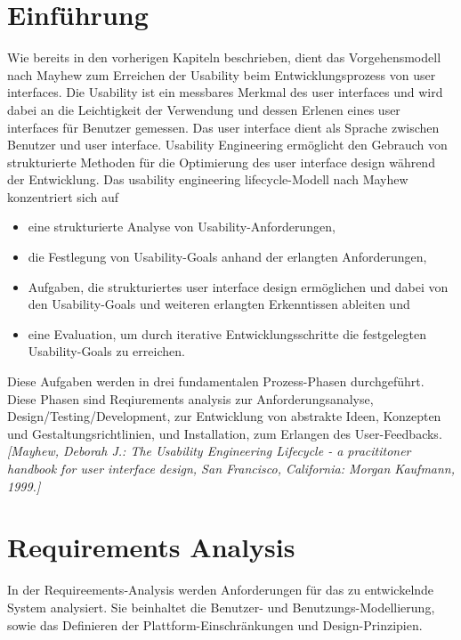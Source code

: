 \documentclass[a4paper,11pt]{article}%
\renewcommand{\\}{\vspace*{0.5\baselineskip} \newline}
\begin{document}
\section{Einführung}
	Wie bereits in den vorherigen Kapiteln beschrieben, dient das Vorgehensmodell nach Mayhew zum Erreichen der Usability beim Entwicklungsprozess von user interfaces. Die Usability ist ein messbares Merkmal des user interfaces und wird dabei an die Leichtigkeit der Verwendung und dessen Erlenen eines user interfaces für Benutzer gemessen. Das user interface dient als Sprache zwischen Benutzer und user interface. Usability Engineering ermöglicht den Gebrauch von strukturierte Methoden für die Optimierung des user interface design während der Entwicklung. Das usability engineering lifecycle-Modell nach Mayhew konzentriert sich auf 
	\begin{itemize}
		\item eine strukturierte Analyse von Usability-Anforderungen,
		\item die Festlegung von Usability-Goals anhand der erlangten Anforderungen,
		\item Aufgaben, die strukturiertes user interface design ermöglichen und dabei von den Usability-Goals und weiteren erlangten Erkenntissen ableiten und
		\item eine Evaluation, um durch iterative Entwicklungsschritte die festgelegten Usability-Goals zu erreichen.
	\end{itemize}
	Diese Aufgaben werden in drei fundamentalen Prozess-Phasen durchgeführt. Diese Phasen sind Reqiurements analysis zur Anforderungsanalyse, Design/Testing/Development, zur Entwicklung von abstrakte Ideen, Konzepten und Gestaltungsrichtlinien, und Installation, zum Erlangen des User-Feedbacks. \emph{[Mayhew, Deborah J.:	The Usability Engineering Lifecycle - a pracititoner handbook for user interface design, San Francisco, California: Morgan Kaufmann, 1999.]}
\newpage
\section{Requirements Analysis}
	In der Requireements-Analysis werden Anforderungen für das zu entwickelnde System analysiert. Sie beinhaltet die Benutzer- und Benutzungs-Modellierung, sowie das Definieren der Plattform-Einschränkungen und Design-Prinzipien. 
\end{document}
